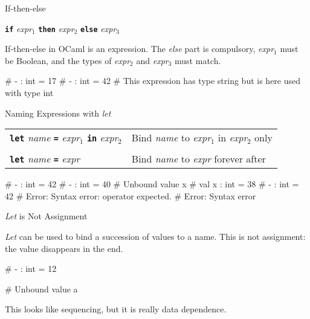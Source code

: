 \documentclass{plt}
\begin{document}
\begin{frame}[fragile]{If-then-else}

  \begin{center}
  \textbf{\texttt{if}} \emph{expr}$_1$ \textbf{\texttt{then}}
  \emph{expr}$_2$ \textbf{\texttt{else}} \emph{expr}$_3$
  \end{center}

  If-then-else in OCaml is an expression.  The \emph{else} part is
  compulsory, \emph{expr}$_1$ must be Boolean, and the types of
  \emph{expr}$_2$ and \emph{expr}$_3$ must match.

\begin{interactive}
# 
- : int = 17
\li
# 
- : int = 42
\li
# 
This expression has type string but is here used with type int
\end{interactive}

\end{frame}

\begin{frame}[fragile]{Naming Expressions with \emph{let}}

  \begin{tabular}{ll}
    \textbf{\texttt{let}} \emph{name} \textbf{\texttt{=}}
    \emph{expr}$_1$ \texttt{\textbf{in}} \emph{expr}$_2$ &
  Bind \emph{name} to \emph{expr}$_1$ in \emph{expr}$_2$ only
  \\
  \\
  \textbf{\texttt{let}} \emph{name} \textbf{\texttt{=}} \emph{expr} &
  Bind \emph{name} to \emph{expr} forever after  

  \end{tabular}
  
\begin{interactive}
# 
  - : int = 42
\li
# 
- : int = 40
\li
# 
Unbound value x
\li
# 
val x : int = 38
\li
# 
- : int = 42
\li
# 
Error: Syntax error: operator expected.
\li
# 
Error: Syntax error
\end{interactive}

\end{frame}

\begin{frame}[fragile]{\emph{Let} is Not Assignment}

\emph{Let} can be used to bind a succession of values to a name.
This is not assignment: the value disappears in the end.

\begin{interactive}
# 
- : int = 12

# 
Unbound value a
\end{interactive}

This looks like sequencing, but it is really data dependence.

\end{frame}
\end{document}

